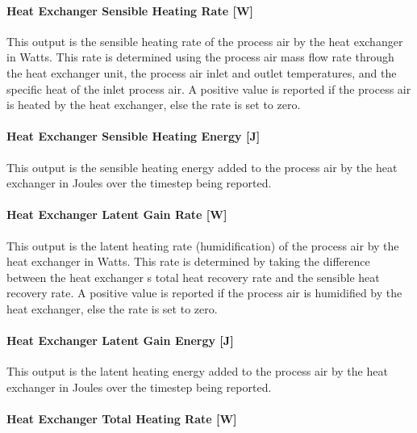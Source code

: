 \paragraph{Heat Exchanger Sensible Heating Rate {[}W{]}}\label{heat-exchanger-sensible-heating-rate-w-2}

This output is the sensible heating rate of the process air by the heat exchanger in Watts. This rate is determined using the process air mass flow rate through the heat exchanger unit, the process air inlet and outlet temperatures, and the specific heat of the inlet process air. A positive value is reported if the process air is heated by the heat exchanger, else the rate is set to zero.

\paragraph{Heat Exchanger Sensible Heating Energy {[}J{]}}\label{heat-exchanger-sensible-heating-energy-j-2}

This output is the sensible heating energy added to the process air by the heat exchanger in Joules over the timestep being reported.

\paragraph{Heat Exchanger Latent Gain Rate {[}W{]}}\label{heat-exchanger-latent-gain-rate-w-2}

This output is the latent heating rate (humidification) of the process air by the heat exchanger in Watts. This rate is determined by taking the difference between the heat exchanger s total heat recovery rate and the sensible heat recovery rate. A positive value is reported if the process air is humidified by the heat exchanger, else the rate is set to zero.

\paragraph{Heat Exchanger Latent Gain Energy {[}J{]}}\label{heat-exchanger-latent-gain-energy-j-1}

This output is the latent heating energy added to the process air by the heat exchanger in Joules over the timestep being reported.

\paragraph{Heat Exchanger Total Heating Rate {[}W{]}}\label{heat-exchanger-total-heating-rate-w-2}

